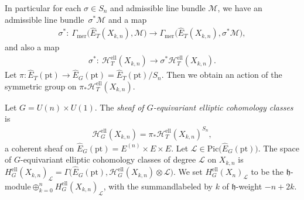 \documentclass[10pt,a4paper]{amsart}
\numberwithin{equation}{section}
\begin{document}
In particular for each $\sigma\in S_n$ and admissible line bundle $\mathcal M$, we have an admissible line bundle~$\sigma^*\mathcal M$ and a map
\begin{gather*} \sigma^*\colon \ \Gamma_{\mathrm{mer}}\big(\hat E_T(X_{k,n}),\mathcal M\big)\to \Gamma_{\mathrm{mer}}\big(\hat E_T(X_{k,n}),\sigma^*\mathcal M\big),
\end{gather*}
and also a map
\begin{gather*}
 \sigma^*\colon \ \mathcal H^{\mathrm{ell}}_T(X_{k,n})\to \sigma^*\mathcal H^{\mathrm{ell}}_T(X_{k,n}).
\end{gather*}
Let $\pi\colon \hat E_T(\mathrm{pt})\to \hat E_G(\mathrm{pt})=\hat E_T(\mathrm{pt})/S_n$. Then we obtain an action of the symmetric group on $\pi_*\mathcal H^{\mathrm{ell}}_T(X_{k,n})$.
\begin{Definition}\label{def-G-equiv} Let $G=U(n)\times U(1)$. The {\em sheaf of $G$-equivariant elliptic cohomology classes} is
 \begin{gather*}
 \mathcal H^{\mathrm{ell}}_G(X_{k,n})=\pi_*\mathcal H^{\mathrm{ell}}_T(X_{k,n})^{S_n},
 \end{gather*}
a coherent sheaf on $\hat E_G(\mathrm{pt})=E^{(n)}\times E\times E$. Let $\mathcal L\in\mathrm{Pic}\big(\hat E_G(\mathrm{pt})\big)$. The space of $G$-equivariant elliptic cohomology classes of degree $\mathcal L$ on $X_{k,n}$ is $H^{\mathrm{ell}}_G(X_{k,n})_{\mathcal L}=\Gamma\big(\hat E_G(\mathrm{pt}),\mathcal H_G^{\mathrm{ell}}(X_{k,n})\otimes\mathcal L\big)$. We set $H^{\mathrm{ell}}_G(X_n)_{\mathcal L}$ to be the $\mathfrak h$-module$\oplus_{k=0}^n H^{\mathrm{ell}}_G(X_{k,n})_{\mathcal L}$, with the summandlabeled by $k$ of $\mathfrak h$-weight $-n+2k$.
\end{Definition}
\end{document}

